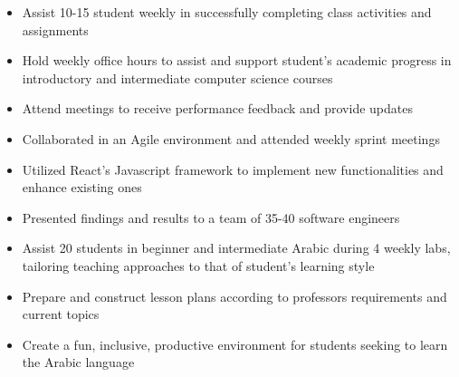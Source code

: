 {}
\begin{itemize}
    \item Assist 10-15  student weekly in successfully completing class
          activities and \\ assignments
    \item Hold weekly office hours to assist and support student’s academic
          progress in introductory and intermediate computer science courses
    \item Attend meetings to receive performance feedback and provide updates
\end{itemize}
\smallskip
{}
\begin{itemize}
    \item Collaborated in an Agile environment and attended weekly sprint meetings
    \item Utilized React’s Javascript framework to implement new functionalities
          and \\ enhance existing ones
    \item Presented findings and results to a team of 35-40 software engineers
\end{itemize}
\smallskip
{}
\begin{itemize}
    \item Assist 20 students in beginner and intermediate Arabic during 4 weekly
          labs, tailoring teaching approaches to that of student’s learning style
    \item Prepare and construct lesson plans according to professors requirements and current topics
    \item Create a fun, inclusive, productive environment for students seeking to learn the Arabic language
\end{itemize}
\smallskip
{}
